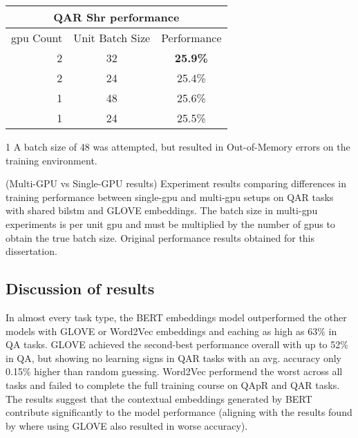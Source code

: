 \begin{table}[]
    \begin{threeparttable}
        \begin{tabular}{rc|c}
            \toprule
            \multicolumn{3}{c}{QA\rightarrow{}R Shr performance}         \\
            \midrule
            \gls{gpu} Count & Unit Batch Size & Performance              \\
            2               & 32              & \textbf{25.9\%}\tnote{1} \\
            2               & 24              & 25.4\%                   \\
            1               & 48              & 25.6\%                   \\
            1               & 24              & 25.5\%                   \\
            \bottomrule
        \end{tabular}
        \begin{tablenotes}
            \item[1] A batch size of 48 was attempted, but resulted in Out-of-Memory errors on the training environment.
        \end{tablenotes}
    \end{threeparttable}
    \captionsource(Multi-GPU vs Single-GPU results)
    {Experiment results comparing differences in training performance between single-\gls{gpu} and multi-\gls{gpu} setups on QA\rightarrow{}R tasks with shared \gls{bilstm} and GLOVE embeddings. The batch size in multi-\gls{gpu} experiments is per unit \gls{gpu} and must be multiplied by the number of \glspl{gpu} to obtain the true batch size. \label{tab:single-vs-multi-gpu-experiment-results}}
    {Original performance results obtained for this dissertation.}
\end{table}

\subsection{Discussion of results}
\label{subsec:discussion_of_results}

In almost every task type, the BERT embeddings model outperformed the other models with GLOVE or Word2Vec embeddings and eaching as high as 63\% in Q\rightarrow{}A tasks.
GLOVE achieved the second-best performance overall with up to 52\% in Q\rightarrow{}A, but showing no learning signs in Q\rightarrow{}AR tasks with an avg. accuracy only 0.15\% higher than random guessing.
Word2Vec performend the worst across all tasks and failed to complete the full training course on QAp\rightarrow{}R and Q\rightarrow{}AR tasks.
The results suggest that the contextual embeddings generated by BERT contribute significantly to the model performance (aligning with the results found by \citeauthor{zellers_recognition_2019} where using GLOVE also resulted in worse accuracy\cite{zellers_recognition_2019}).

